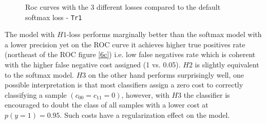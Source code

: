 \documentclass[a4paper]{article}
\begin{document}
            \begin{figure}[H]
            \centering

            \caption{Roc curves with the 3 different losses compared to the default softmax loss - \texttt{Tr1}}
            \end{figure}

            The model with $H1$-loss performs marginally better than the softmax model with a lower precision yet on the ROC curve it achieves higher true positives rate (northeast of the ROC figure \ref{6c}) i.e. low false negatives rate which is coherent with the higher false negative cost assigned (1 vs. 0.05). $H2$ is slightly equivalent to the softmax model. $H3$ on the other hand performs surprisingly well, one possible interpretation is that most classifiers assign a zero cost to correctly classifying a sample $(c_{00}=c_{11}=0)$, however, with $H3$ the classifier is encouraged to doubt the class of all samples with a lower cost at $p(y=1)=0.95$. Such costs have a regularization effect on the model.
\end{document}
